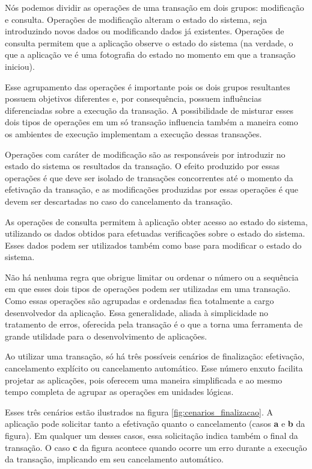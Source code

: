 \documentclass[11pt,twoside,a4paper]{book}
\begin{document}
Nós podemos dividir as operações de uma transação em dois grupos: modificação e consulta. Operações de modificação alteram o estado do sistema, seja introduzindo novos dados ou modificando dados já existentes. Operações de consulta permitem que a aplicação observe o estado do sistema (na verdade, o que a aplicação ve é uma fotografia do estado no momento em que a transação iniciou).

Esse agrupamento das operações é importante pois os dois grupos resultantes possuem objetivos diferentes e, por consequência, possuem influências diferenciadas sobre a execução da transação. A possibilidade de misturar esses dois tipos de operações em um só transação influencia também a maneira como os ambientes de execução implementam a execução dessas transações.

Operações com caráter de modificação são as responsáveis por introduzir no estado do sistema os resultados da transação. O efeito produzido por essas operações é que deve ser isolado de transações concorrentes até o momento da efetivação da transação, e as modificações produzidas por essas operações é que devem ser descartadas no caso do cancelamento da transação. 

As operações de consulta permitem à aplicação obter acesso ao estado do sistema, utilizando os dados obtidos para efetuadas verificações sobre o estado do sistema. Esses dados podem ser utilizados também como base para modificar o estado do sistema.

Não há nenhuma regra que obrigue limitar ou ordenar o número ou a sequência em que esses dois tipos de operações podem ser utilizadas em uma transação. Como essas operações são agrupadas e ordenadas fica totalmente a cargo desenvolvedor da aplicação. Essa generalidade, aliada à simplicidade no tratamento de erros, oferecida pela transação é o que a torna uma ferramenta de grande utilidade para o desenvolvimento de aplicações.

Ao utilizar uma transação, só há três possíveis cenários de finalização: efetivação, cancelamento explícito ou cancelamento automático. Esse número enxuto facilita projetar as aplicações, pois oferecem uma maneira simplificada e ao mesmo tempo completa de agrupar as operações em unidades lógicas.

Esses três cenários estão ilustrados na figura \ref{fig:cenarios_finalizacao}. A aplicação pode solicitar tanto a efetivação quanto o cancelamento (casos \textbf{a} e \textbf{b} da figura). Em qualquer um desses casos, essa solicitação indica também o final da transação. O caso \textbf{c} da figura acontece quando ocorre um erro durante a execução da transação, implicando em seu cancelamento automático.
\end{document}
